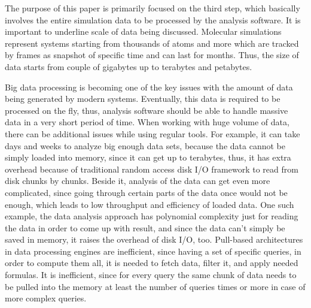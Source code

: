 \documentclass[12pt,letterpaper]{report}
\begin{document}
\noindent\hspace{3em}The purpose of this paper is primarily focused on the third step, which basically involves the entire simulation data to be processed by the analysis software. It is important to underline scale of data being discussed. Molecular simulations represent systems starting from thousands of atoms and more which are tracked by frames as snapshot of specific time and can last for months. Thus, the size of data starts from couple of gigabytes up to terabytes and petabytes.

\noindent\hspace{3em}Big data processing is becoming one of the key issues with the amount of data being generated by modern systems. Eventually, this data is required to be processed on the fly, thus, analysis software should be able to handle massive data in a very short period of time. When working with huge volume of data, there can be additional issues while using regular tools. For example, it can take days and weeks to analyze big enough data sets, because the data cannot be simply loaded into memory, since it can get up to terabytes, thus, it has extra overhead because of traditional random access disk I/O framework to read from disk chunks by chunks. Beside it, analysis of the data can get even more complicated, since going through certain parts of the data once would not be enough, which leads to low throughput and efficiency of loaded data. One such example, the data analysis approach has polynomial complexity just for reading the data in order to come up with result, and since the data can't simply be saved in memory, it raises the overhead of disk I/O, too. Pull-based architectures in data processing engines are inefficient, since having a set of specific queries, in order to compute them all, it is needed to fetch data, filter it, and apply needed formulas. It is inefficient, since for every query the same chunk of data needs to be pulled into the memory at least the number of queries times or more in case of more complex queries.
\end{document}
